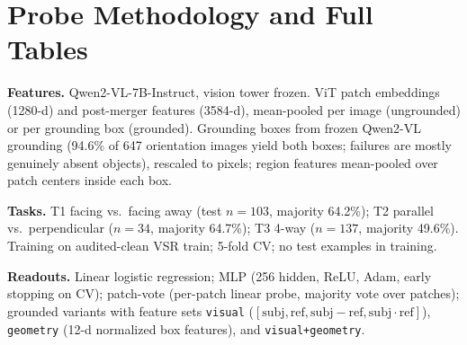 \section{Probe Methodology and Full Tables}
\label{app:probes}

\textbf{Features.} Qwen2-VL-7B-Instruct, vision tower frozen. ViT patch
embeddings (1280-d) and post-merger features (3584-d), mean-pooled per image
(ungrounded) or per grounding box (grounded). Grounding boxes from frozen
Qwen2-VL grounding (94.6\% of 647 orientation images yield both boxes; failures
are mostly genuinely absent objects), rescaled to pixels; region features
mean-pooled over patch centers inside each box.

\textbf{Tasks.} T1 facing vs.\ facing away (test $n{=}103$, majority 64.2\%);
T2 parallel vs.\ perpendicular ($n{=}34$, majority 64.7\%); T3 4-way
($n{=}137$, majority 49.6\%). Training on audited-clean VSR train; 5-fold CV;
no test examples in training.

\textbf{Readouts.} Linear logistic regression; MLP (256 hidden, ReLU, Adam,
early stopping on CV); patch-vote (per-patch linear probe, majority vote over
patches); grounded variants with feature sets \texttt{visual}
($[\text{subj},\text{ref},\text{subj}-\text{ref},\text{subj}\cdot\text{ref}]$),
\texttt{geometry} (12-d normalized box features), and \texttt{visual+geometry}.

